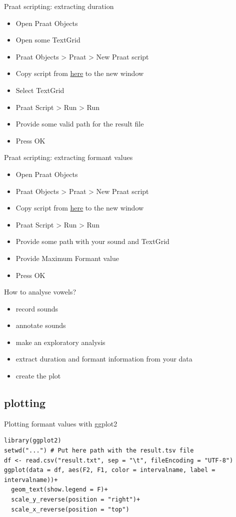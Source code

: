 \begin{frame}{Praat scripting: extracting duration}
\begin{itemize}
\item Open Praat Objects
\item Open some TextGrid
\item Praat Objects > Praat > New Praat script
\item Copy script from \href{https://goo.gl/n7vbDy}{here} to the new window
\item Select TextGrid
\item Praat Script > Run > Run
\item Provide some valid path for the result file
\item Press OK
\end{itemize}
\end{frame}

\begin{frame}{Praat scripting: extracting formant values}
\begin{itemize}
\item Open Praat Objects
\item Praat Objects > Praat > New Praat script
\item Copy script from \href{https://goo.gl/MUBpPw}{here} to the new window
\item Praat Script > Run > Run
\item Provide some path with your sound and TextGrid
\item Provide Maximum Formant value
\item Press OK
\end{itemize}
\end{frame}

\begin{frame}{How to analyse vowels?}
\begin{itemize}
\item[\checkmark] record sounds
\item[\checkmark] annotate sounds
\item[\checkmark] make an exploratory analysis
\item[\checkmark] extract duration and formant information from your data
\item create the plot
\end{itemize}
\end{frame}

\subsection{plotting}
\begin{frame}[fragile]{Plotting formant values with ggplot2}
\scriptsize
\begin{verbatim}
library(ggplot2)
setwd("...") # Put here path with the result.tsv file
df <- read.csv("result.txt", sep = "\t", fileEncoding = "UTF-8")
ggplot(data = df, aes(F2, F1, color = intervalname, label = intervalname))+
  geom_text(show.legend = F)+
  scale_y_reverse(position = "right")+
  scale_x_reverse(position = "top")
\end{verbatim}
\end{frame}


